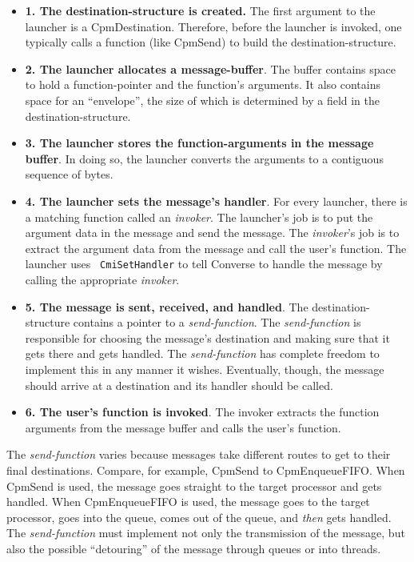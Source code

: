 \begin{itemize}

\item[]{{\bf 1. The destination-structure is created.}  The first
argument to the launcher is a CpmDestination.  Therefore, before the
launcher is invoked, one typically calls a function (like CpmSend)
to build the destination-structure.}

\item[]{{\bf 2. The launcher allocates a message-buffer}.  The buffer
contains space to hold a function-pointer and the function's arguments.
It also contains space for an ``envelope'', the size of which is
determined by a field in the destination-structure.}

\item[]{{\bf 3. The launcher stores the function-arguments in the message
buffer}.  In doing so, the launcher converts the arguments to a
contiguous sequence of bytes.}

\item[]{{\bf 4. The launcher sets the message's handler}.  For every
launcher, there is a matching function called an {\it invoker}.  The
launcher's job is to put the argument data in the message and send the
message.  The {\it invoker}'s job is to extract the argument data from
the message and call the user's function.  The launcher uses {\tt
CmiSetHandler} to tell Converse to handle the message by calling the
appropriate {\it invoker}.}

\item[]{{\bf 5. The message is sent, received, and handled}. 
The destination-structure contains a pointer to a {\it send-function}.
The {\it send-function} is responsible for choosing the message's
destination and making sure that it gets there and gets handled.  The
{\it send-function} has complete freedom to implement this in any
manner it wishes.  Eventually, though, the message should arrive at a
destination and its handler should be called.}

\item[]{{\bf 6. The user's function is invoked}.  The invoker
extracts the function arguments from the message buffer and calls
the user's function.}

\end{itemize}

The {\it send-function} varies because messages take different
routes to get to their final destinations.  Compare, for example,
CpmSend to CpmEnqueueFIFO.  When CpmSend is used, the message goes
straight to the target processor and gets handled.  When
CpmEnqueueFIFO is used, the message goes to the target processor, goes
into the queue, comes out of the queue, and {\it then} gets handled.
The {\it send-function} must implement not only the transmission of
the message, but also the possible ``detouring'' of the message
through queues or into threads.

